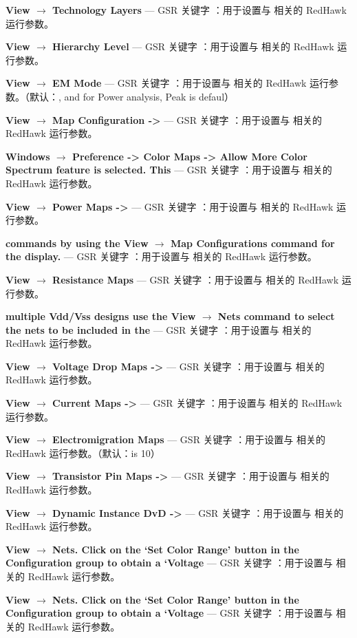 \textbf{View $\rightarrow$ Technology Layers} — GSR 关键字 ：用于设置与  相关的 RedHawk 运行参数。

\textbf{View $\rightarrow$ Hierarchy Level} — GSR 关键字 ：用于设置与  相关的 RedHawk 运行参数。

\textbf{View $\rightarrow$ EM Mode} — GSR 关键字 ：用于设置与  相关的 RedHawk 运行参数。（默认：, and for Power analysis, Peak is defaul）

\textbf{View $\rightarrow$ Map Configuration ->} — GSR 关键字 ：用于设置与  相关的 RedHawk 运行参数。

\textbf{Windows $\rightarrow$ Preference -> Color Maps -> Allow More Color Spectrum feature is selected. This} — GSR 关键字 ：用于设置与  相关的 RedHawk 运行参数。

\textbf{View $\rightarrow$ Power Maps ->} — GSR 关键字 ：用于设置与  相关的 RedHawk 运行参数。

\textbf{commands by using the View $\rightarrow$ Map Configurations command for the display.} — GSR 关键字 ：用于设置与  相关的 RedHawk 运行参数。

\textbf{View $\rightarrow$ Resistance Maps} — GSR 关键字 ：用于设置与  相关的 RedHawk 运行参数。

\textbf{multiple Vdd/Vss designs use the View $\rightarrow$ Nets command to select the nets to be included in the} — GSR 关键字 ：用于设置与  相关的 RedHawk 运行参数。

\textbf{View $\rightarrow$ Voltage Drop Maps ->} — GSR 关键字 ：用于设置与  相关的 RedHawk 运行参数。

\textbf{View $\rightarrow$ Current Maps ->} — GSR 关键字 ：用于设置与  相关的 RedHawk 运行参数。

\textbf{View $\rightarrow$ Electromigration Maps} — GSR 关键字 ：用于设置与  相关的 RedHawk 运行参数。（默认：is 10）

\textbf{View $\rightarrow$ Transistor Pin Maps ->} — GSR 关键字 ：用于设置与  相关的 RedHawk 运行参数。

\textbf{View $\rightarrow$ Dynamic Instance DvD ->} — GSR 关键字 ：用于设置与  相关的 RedHawk 运行参数。

\textbf{View $\rightarrow$ Nets. Click on the ‘Set Color Range’ button in the Configuration group to obtain a ‘Voltage} — GSR 关键字 ：用于设置与  相关的 RedHawk 运行参数。

\textbf{View $\rightarrow$ Nets. Click on the ‘Set Color Range’ button in the Configuration group to obtain a ‘Voltage} — GSR 关键字 ：用于设置与  相关的 RedHawk 运行参数。

